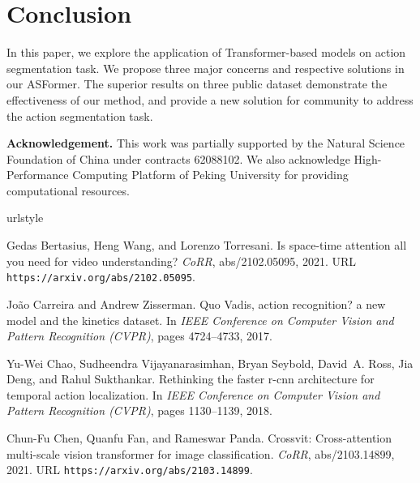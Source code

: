 \documentclass{bmvc2k}
\begin{document}
\section{Conclusion}
In this paper, we explore the application of Transformer-based models on action segmentation task. We propose three major concerns and respective solutions in our ASFormer. The superior results on three public dataset demonstrate the effectiveness of our method, and provide a new solution for community to address the action segmentation task. 

\noindent
\textbf{Acknowledgement.} This work was partially supported by the Natural Science Foundation of China under contracts 62088102. We also acknowledge High-Performance Computing Platform of Peking University for providing computational resources.

\begin{thebibliography}{53}
\providecommand{\natexlab}[1]{#1}
\providecommand{\url}[1]{\texttt{#1}}
\expandafter\ifx\csname urlstyle\endcsname\relax
  \providecommand{\doi}[1]{doi: #1}\else
  \providecommand{\doi}{doi: \begingroup \urlstyle{rm}\Url}\fi

Gedas Bertasius, Heng Wang, and Lorenzo Torresani.
\newblock Is space-time attention all you need for video understanding?
\newblock \emph{CoRR}, abs/2102.05095, 2021.
\newblock URL \url{https://arxiv.org/abs/2102.05095}.

João Carreira and Andrew Zisserman.
\newblock Quo {V}adis, action recognition? a new model and the kinetics
  dataset.
\newblock In \emph{{IEEE} Conference on Computer Vision and Pattern Recognition
  (CVPR)}, pages 4724--4733, 2017.

Yu-Wei Chao, Sudheendra Vijayanarasimhan, Bryan Seybold, David~A. Ross, Jia
  Deng, and Rahul Sukthankar.
\newblock Rethinking the faster r-cnn architecture for temporal action
  localization.
\newblock In \emph{{IEEE} Conference on Computer Vision and Pattern Recognition
  (CVPR)}, pages 1130--1139, 2018.

Chun{-}Fu Chen, Quanfu Fan, and Rameswar Panda.
\newblock Crossvit: Cross-attention multi-scale vision transformer for image
  classification.
\newblock \emph{CoRR}, abs/2103.14899, 2021.
\newblock URL \url{https://arxiv.org/abs/2103.14899}.


\end{thebibliography}
\end{document}
